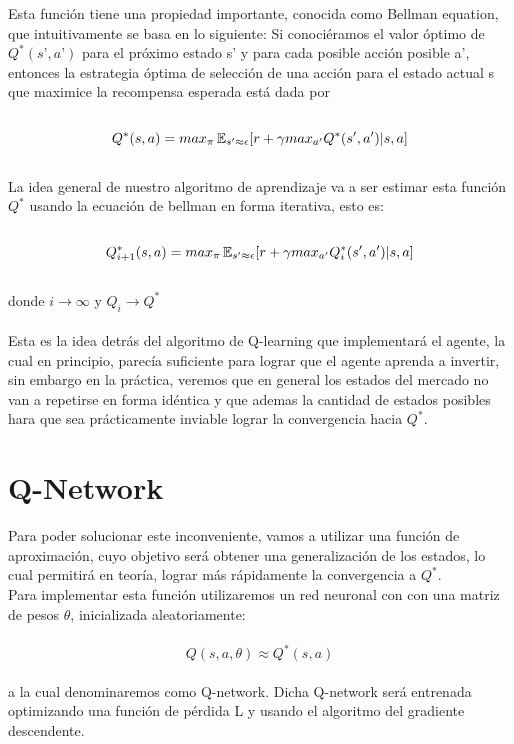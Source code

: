 Esta función tiene una propiedad importante, conocida como Bellman equation, que intuitivamente se basa en lo siguiente: 
Si conociéramos el valor óptimo de $Q^*(s’, a’)$ para el próximo estado s’ y para cada posible acción posible a’, entonces la estrategia óptima de selección de una acción para el estado actual s que maximice la recompensa esperada está dada por
\\\\
\begin{equation}
Q^*(s, a) = max_{\pi} \operatorname{\mathbb{E}}_{s' \approx \epsilon} [ r + \gamma max_{a'} Q^*(s', a')  |  s, a]
\end{equation}
\\
La idea general de nuestro algoritmo de aprendizaje va a ser estimar esta función $Q^*$ usando la ecuación de bellman en forma iterativa, esto es:
\\\\
\begin{equation}
Q^*_{i+1}(s, a) = max_{\pi} \operatorname{\mathbb{E}}_{s' \approx \epsilon} [ r + \gamma max_{a'} Q_{i}^*(s', a')  |  s, a]
\end{equation}
\\
donde  $i\rightarrow\infty$ y $Q_i \rightarrow Q^*$
\\\\
Esta es la idea detrás del algoritmo de Q-learning que implementará el agente, la cual en principio, parecía suficiente para lograr que el agente aprenda a invertir, sin embargo en la práctica, veremos que en general los estados del mercado no van a repetirse en forma idéntica y que ademas la cantidad de estados posibles hara que sea prácticamente inviable lograr la convergencia hacia $Q^*$.

\section{Q-Network}
Para poder solucionar este inconveniente, vamos a utilizar una función de aproximación, cuyo objetivo será obtener una generalización de los estados, lo cual permitirá en teoría, lograr más rápidamente la convergencia a $Q^*$.\\
Para implementar esta función utilizaremos un red neuronal con con una matriz de pesos $\theta$, inicializada aleatoriamente: 
\\\\
\begin{equation}
Q(s, a, \theta) \approx Q^*(s, a) 
\end{equation}
\\
a la cual denominaremos como Q-network.
Dicha Q-network será entrenada optimizando una función de pérdida L y usando el algoritmo del gradiente descendente.
\\

